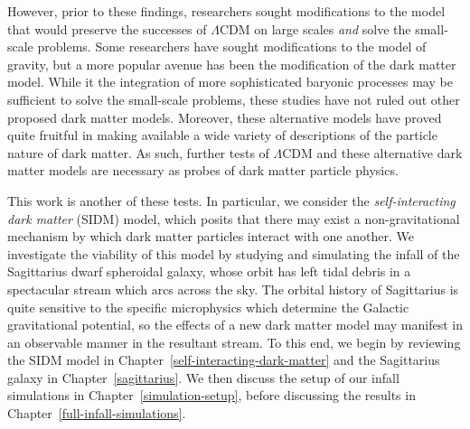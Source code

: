 However, prior to these findings, researchers sought modifications to the
model that would preserve the successes of \(\Lambda\)CDM on large scales
\emph{and} solve the small-scale problems. Some researchers have sought
modifications to the model of gravity, but a more popular avenue has been the
modification of the dark matter model. While it the integration of more
sophisticated baryonic processes may be sufficient to solve the small-scale
problems, these studies have not ruled out other proposed dark matter models.
Moreover, these alternative models have proved quite fruitful in making
available a wide variety of descriptions of the particle nature of dark matter.
As such, further tests of \(\Lambda\)CDM and these alternative dark matter
models are necessary as probes of dark matter particle physics.

This work is another of these tests.  In particular, we consider the
\emph{self-interacting dark matter} (SIDM) model, which posits that there may
exist a non-gravitational mechanism by which dark matter particles interact
with one another.  We investigate the viability of this model by studying and
simulating the infall of the Sagittarius dwarf spheroidal galaxy, whose orbit
has left tidal debris in a spectacular stream which arcs across the sky.  The
orbital history of Sagittarius is quite sensitive to the specific microphysics
which determine the Galactic gravitational potential, so the effects of a new
dark matter model may manifest in an observable manner in the resultant
stream.  To this end, we begin by reviewing the SIDM model in
Chapter~\ref{self-interacting-dark-matter} and the Sagittarius galaxy in
Chapter~\ref{sagittarius}.  We then discuss the setup of our infall simulations
in Chapter~\ref{simulation-setup}, before discussing the results in
Chapter~\ref{full-infall-simulations}. 

